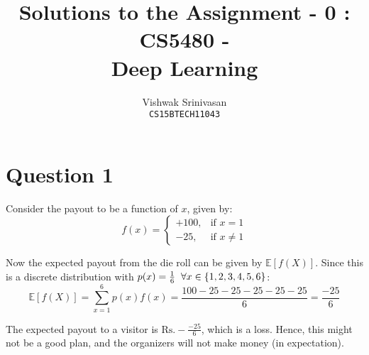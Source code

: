 \documentclass{article}
\title{Solutions to the Assignment - 0 : CS5480 - \\
Deep Learning}
\author{Vishwak Srinivasan\\
\texttt{CS15BTECH11043}}
\date{}
\begin{document}
\maketitle

\section*{Question 1}
\begin{flushleft}
Consider the payout to be a function of \(x\), given by:
\begin{equation}
f(x) = \begin{cases} +100, & \text{if } x = 1 \\ -25, & \text{if } x \neq 1 \end{cases}
\end{equation}

Now the expected payout from the die roll can be given by \(\mathbb{E}[f(X)]\). Since this is a discrete distribution with \(p(x) = \frac{1}{6} \hspace{2mm} \forall x \in \{1, 2, 3, 4, 5, 6\}\):
\begin{equation}
\displaystyle \mathbb{E}[f(X)] = \sum_{x=1}^{6} p(x)f(x) = \frac{100 - 25 - 25 - 25 - 25 - 25}{6} = \frac{-25}{6}
\end{equation}

The expected payout to a visitor is \(\boxed{\text{Rs.} -\frac{-25}{6}}\), which is a loss. Hence, this might not be a good plan, and the organizers will not make money (in expectation).
\end{flushleft}
\end{document}
